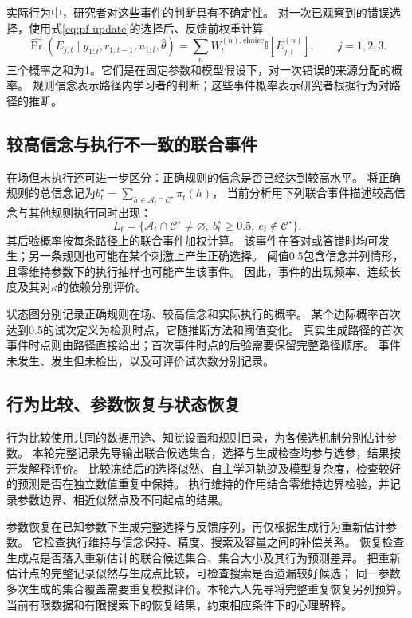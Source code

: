 \documentclass[11pt,a4paper]{article}
\numberwithin{equation}{section}
\newcommand{\ind}{\mathbb{I}}
\newcommand{\A}{\mathcal{A}}
\begin{document}
实际行为中，研究者对这些事件的判断具有不确定性。
对一次已观察到的错误选择，使用式\eqref{eq:pf-update}的选择后、反馈前权重计算
\begin{equation}
\widehat{\Pr}(E_{j,t}\mid y_{1:t},r_{1:t-1},u_{1:t},\widehat\theta)
=\sum_n W_t^{(n),\mathrm{choice}}\ind[E_{j,t}^{(n)}],
\qquad j=1,2,3.
\label{eq:error-posterior}
\end{equation}
三个概率之和为1。它们是在固定参数和模型假设下，对一次错误的来源分配的概率。
规则信念表示路径内学习者的判断；这些事件概率表示研究者根据行为对路径的推断。

\subsection{较高信念与执行不一致的联合事件}
\label{sec:lag}
在场但未执行还可进一步区分：正确规则的信念是否已经达到较高水平。
将正确规则的总信念记为$b_t^\star=\sum_{h\in\A_t\cap\mathcal C^\star}\pi_t(h)$，
当前分析用下列联合事件描述较高信念与其他规则执行同时出现：
\begin{equation}
L_t=\{\A_t\cap\mathcal C^\star\ne\varnothing,\ b_t^\star\geq0.5,
\ e_t\notin\mathcal C^\star\}.
\label{eq:lag}
\end{equation}
其后验概率按每条路径上的联合事件加权计算。
该事件在答对或答错时均可发生；另一条规则也可能在某个刺激上产生正确选择。
阈值0.5包含信念并列情形，且零维持参数下的执行抽样也可能产生该事件。
因此，事件的出现频率、连续长度及其对$\kappa$的依赖分别评价。

状态图分别记录正确规则在场、较高信念和实际执行的概率。
某个边际概率首次达到0.5的试次定义为检测时点，它随推断方法和阈值变化。
真实生成路径的首次事件时点则由路径直接给出；首次事件时点的后验需要保留完整路径顺序。
事件未发生、发生但未检出，以及可评价试次数分别记录。

\subsection{行为比较、参数恢复与状态恢复}
行为比较使用共同的数据用途、知觉设置和规则目录，为各候选机制分别估计参数。
本轮完整记录先导输出联合候选集合，选择与生成检查均参与选参，结果按开发解释评价。
比较冻结后的选择似然、自主学习轨迹及模型复杂度，检查较好的预测是否在独立数值重复中保持。
执行维持的作用结合零维持边界检验，并记录参数边界、相近似然点及不同起点的结果。

参数恢复在已知参数下生成完整选择与反馈序列，再仅根据生成行为重新估计参数。
它检查执行维持与信念保持、精度、搜索及容量之间的补偿关系。
恢复检查生成点是否落入重新估计的联合候选集合、集合大小及其行为预测差异。
把重新估计点的完整记录似然与生成点比较，可检查搜索是否遗漏较好候选；
同一参数多次生成的集合覆盖需要重复模拟评价。本轮六人先导将完整重复恢复另列预算。
当前有限数据和有限搜索下的恢复结果，约束相应条件下的心理解释。
\end{document}
